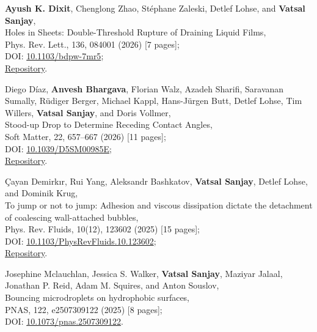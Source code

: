 \begin{enumerate}[leftmargin=1.5em,label=\textbf{[\arabic*]}]
	\item \textbf{Ayush K. Dixit}, Chenglong Zhao, St\'ephane Zaleski, Detlef Lohse, and \textbf{Vatsal Sanjay},\\
	Holes in Sheets: Double-Threshold Rupture of Draining Liquid Films,\\
	Phys. Rev. Lett., 136, 084001 (2026) [7 pages];\\
	\faFile\hspace{0.2em}DOI: \href{https://doi.org/10.1103/bdpw-7mr5}{10.1103/bdpw-7mr5};\\
	\faGithub\hspace{0.2em}\href{https://github.com/comphy-lab/HoleySheet}{Repository}.

	\item Diego Díaz, \textbf{Anvesh Bhargava}, Florian Walz, Azadeh Sharifi, Saravanan Sumally, Rüdiger Berger, Michael Kappl, Hans-Jürgen Butt, Detlef Lohse, Tim Willers, \textbf{Vatsal Sanjay}, and Doris Vollmer,\\
	Stood-up Drop to Determine Receding Contact Angles,\\
	Soft Matter, 22, 657--667 (2026) [11 pages];\\
	\faFile\hspace{0.2em}DOI: \href{https://doi.org/10.1039/D5SM00985E}{10.1039/D5SM00985E};\\
	\faGithub\hspace{0.2em}\href{https://github.com/comphy-lab/Retracting-Droplet}{Repository}.

	\item Çayan Demirkır, Rui Yang, Aleksandr Bashkatov, \textbf{Vatsal Sanjay}, Detlef Lohse, and Dominik Krug,\\
	To jump or not to jump: Adhesion and viscous dissipation dictate the detachment of coalescing wall-attached bubbles,\\
	Phys. Rev. Fluids, 10(12), 123602 (2025) [15 pages];\\
	\faFile\hspace{0.2em}DOI: \href{https://doi.org/10.1103/PhysRevFluids.10.123602}{10.1103/PhysRevFluids.10.123602};\\
	\faGithub\hspace{0.2em}\href{https://github.com/VatsalSy/jumping-bubbles}{Repository}.

	\item Josephine Mclauchlan, Jessica S. Walker, \textbf{Vatsal Sanjay}, Maziyar Jalaal, Jonathan P. Reid, Adam M. Squires, and Anton Souslov,\\
	Bouncing microdroplets on hydrophobic surfaces,\\
	PNAS, 122, e2507309122 (2025) [8 pages];\\
	\faFile\hspace{0.2em}DOI: \href{https://doi.org/10.1073/pnas.2507309122}{10.1073/pnas.2507309122}.


\end{enumerate}
